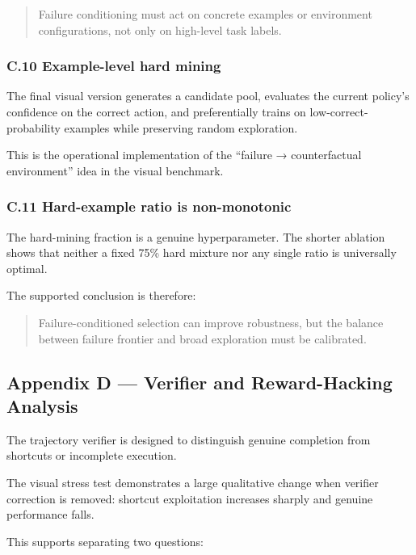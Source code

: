 \documentclass[
]{article}
\begin{document}
\begin{quote}
Failure conditioning must act on concrete examples or environment
configurations, not only on high-level task labels.
\end{quote}

\subsubsection{C.10 Example-level hard
mining}\label{c.10-example-level-hard-mining}

The final visual version generates a candidate pool, evaluates the
current policy's confidence on the correct action, and preferentially
trains on low-correct-probability examples while preserving random
exploration.

This is the operational implementation of the ``failure → counterfactual
environment'' idea in the visual benchmark.

\subsubsection{C.11 Hard-example ratio is
non-monotonic}\label{c.11-hard-example-ratio-is-non-monotonic}

The hard-mining fraction is a genuine hyperparameter. The shorter
ablation shows that neither a fixed 75\% hard mixture nor any single
ratio is universally optimal.

The supported conclusion is therefore:

\begin{quote}
Failure-conditioned selection can improve robustness, but the balance
between failure frontier and broad exploration must be calibrated.
\end{quote}

\subsection{Appendix D --- Verifier and Reward-Hacking
Analysis}\label{appendix-d-verifier-and-reward-hacking-analysis}

The trajectory verifier is designed to distinguish genuine completion
from shortcuts or incomplete execution.

The visual stress test demonstrates a large qualitative change when
verifier correction is removed: shortcut exploitation increases sharply
and genuine performance falls.

This supports separating two questions:
\end{document}
